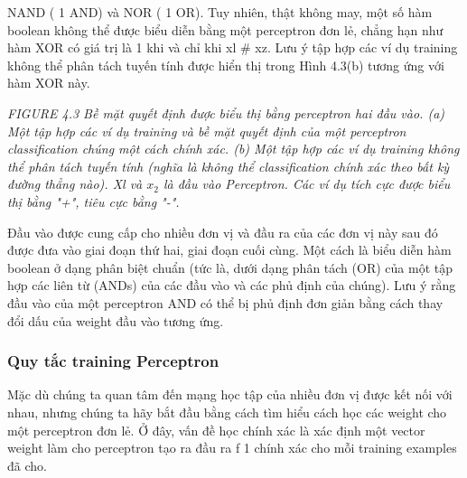 NAND ( 1 AND) và NOR ( 1 OR). Tuy nhiên, thật không may, một số hàm boolean không thể được biểu diễn bằng một perceptron đơn lẻ, chẳng hạn như hàm XOR có giá trị là 1 khi và chỉ khi xl \# xz. Lưu ý tập hợp các ví dụ training không thể phân tách tuyến tính được hiển thị trong Hình 4.3(b) tương ứng với hàm XOR này.

\noindent\textit{FIGURE 4.3 Bề mặt quyết định được biểu thị bằng perceptron hai đầu vào. (a) Một tập hợp các ví dụ training và bề mặt quyết định của một perceptron classification chúng một cách chính xác. (b) Một tập hợp các ví dụ training không thể phân tách tuyến tính (nghĩa là không thể classification chính xác theo bất kỳ đường thẳng nào). Xl và $x_{2}$ là đầu vào Perceptron. Các ví dụ tích cực được biểu thị bằng "+", tiêu cực bằng "-".}

Đầu vào được cung cấp cho nhiều đơn vị và đầu ra của các đơn vị này sau đó được đưa vào giai đoạn thứ hai, giai đoạn cuối cùng. Một cách là biểu diễn hàm boolean ở dạng phân biệt chuẩn (tức là, dưới dạng phân tách (OR) của một tập hợp các liên từ (ANDs) của các đầu vào và các phủ định của chúng). Lưu ý rằng đầu vào của một perceptron AND có thể bị phủ định đơn giản bằng cách thay đổi dấu của weight đầu vào tương ứng.

\subsubsection{Quy tắc training Perceptron}

Mặc dù chúng ta quan tâm đến mạng học tập của nhiều đơn vị được kết nối với nhau, nhưng chúng ta hãy bắt đầu bằng cách tìm hiểu cách học các weight cho một perceptron đơn lẻ. Ở đây, vấn đề học chính xác là xác định một vector weight làm cho perceptron tạo ra đầu ra f 1 chính xác cho mỗi training examples đã cho.

